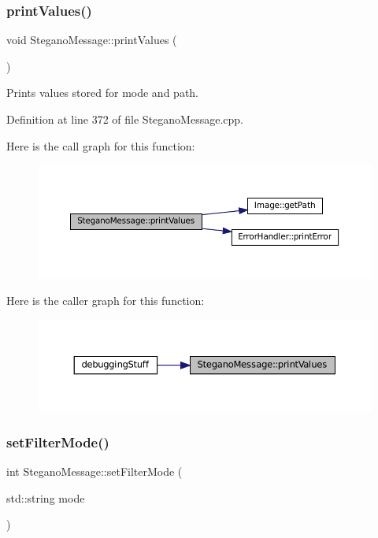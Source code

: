 \subsubsection{\texorpdfstring{printValues()}{printValues()}}
{\footnotesize\ttfamily void Stegano\+Message\+::print\+Values (\begin{DoxyParamCaption}{ }\end{DoxyParamCaption})}



Prints values stored for mode and path. 



Definition at line 372 of file Stegano\+Message.\+cpp.

Here is the call graph for this function\+:\nopagebreak
\begin{figure}[H]
\begin{center}
\leavevmode
\includegraphics[width=350pt]{classSteganoMessage_a3ea3f5ff720bf56d33f168d47e2897b0_cgraph}
\end{center}
\end{figure}
Here is the caller graph for this function\+:\nopagebreak
\begin{figure}[H]
\begin{center}
\leavevmode
\includegraphics[width=350pt]{classSteganoMessage_a3ea3f5ff720bf56d33f168d47e2897b0_icgraph}
\end{center}
\end{figure}
\mbox{\label{classSteganoMessage_a5c3ef910b17f4bbe32a73a33be9d7586}} 
\subsubsection{\texorpdfstring{setFilterMode()}{setFilterMode()}}
{\footnotesize\ttfamily int Stegano\+Message\+::set\+Filter\+Mode (\begin{DoxyParamCaption}\item[{std\+::string}]{mode }\end{DoxyParamCaption})}



